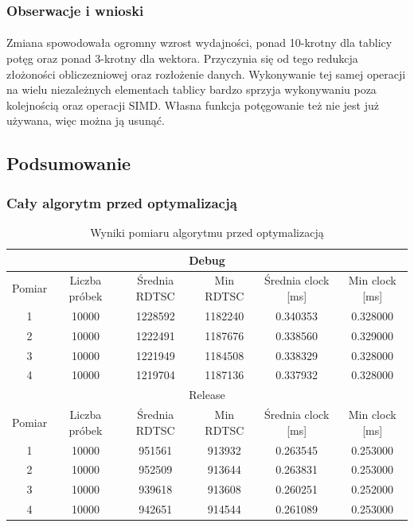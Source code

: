 \documentclass[12pt]{report}
\begin{document}
	\subsubsection{Obserwacje i wnioski}
	\paragraph{}
	Zmiana spowodowała ogromny wzrost wydajności, ponad 10-krotny dla tablicy potęg oraz ponad 3-krotny dla wektora.
	Przyczynia się od tego redukcja złożoności obliczezniowej oraz rozłożenie danych. Wykonywanie tej samej operacji na wielu niezależnych elementach tablicy bardzo sprzyja wykonywaniu poza kolejnością oraz operacji SIMD.
	Własna funkcja potęgowanie też nie jest już używana, więc można ją usunąć. 
	
	\pagebreak
	\subsection{Podsumowanie}
	\subsubsection{Cały algorytm przed optymalizacją}
	\begin{table}[H]
		\centering
		\caption{Wyniki pomiaru algorytmu przed optymalizacją}
		\begin{tabular}{|c|c|c|c|c|c|} \hline
			\multicolumn{6}{|c|}{Debug} \\\hline
			Pomiar  & Liczba próbek & Średnia RDTSC & Min RDTSC & Średnia clock [ms] & Min clock [ms] \\\hline
			1 & 10000 & 1228592 & 1182240 & 0.340353 & 0.328000 \\\hline
			2 & 10000 & 1222491 & 1187676 & 0.338560 & 0.329000 \\\hline
			3 & 10000 & 1221949 & 1184508 & 0.338329 & 0.328000 \\\hline
			4 & 10000 & 1219704 & 1187136 & 0.337932 & 0.328000 \\\hline
			\hline
			\multicolumn{6}{|c|}{Release} \\\hline
			Pomiar  & Liczba próbek & Średnia RDTSC & Min RDTSC & Średnia clock [ms] & Min clock [ms] \\\hline
			1 & 10000 & 951561 & 913932 & 0.263545 & 0.253000 \\\hline
			2 & 10000 & 952509 & 913644 & 0.263831 & 0.253000 \\\hline
			3 & 10000 & 939618 & 913608 & 0.260251 & 0.252000 \\\hline
			4 & 10000 & 942651 & 914544 & 0.261089 & 0.253000 \\\hline
		\end{tabular}
	\end{table}
	
\end{document}
